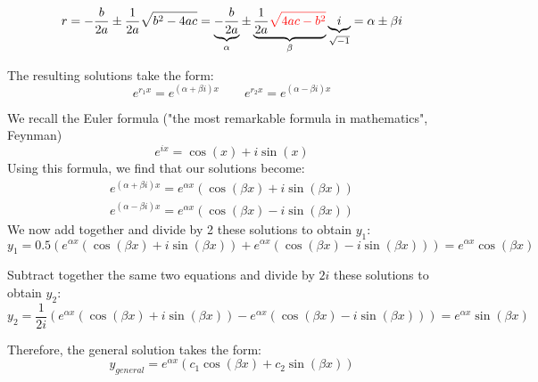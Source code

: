 \begin{equation*}
r=-\frac{b}{2a}\pm \frac{1}{2a}\sqrt{b^2-4ac}=\underbrace{-\frac{b}{2a}}_{\alpha}\pm \underbrace{\frac{1}{2a}\textcolor{red}{\sqrt{4ac-b^2}}}_\beta \underbrace{i}_{\sqrt{-1}}=\alpha\pm\beta i
\end{equation*}

The resulting solutions take the form:
\begin{equation*}
e^{r_1x}=e^{(\alpha+\beta i)x} \qquad e^{r_2x}=e^{(\alpha-\beta i)x}
\end{equation*}

We recall the Euler formula ("the most remarkable formula in mathematics", Feynman)
\begin{equation}
e^{ix}=\cos(x)+i \sin(x)
\end{equation}
Using this formula, we find that our solutions become:
\begin{align*}
e^{(\alpha+\beta i)x}=e^{\alpha x}\left(\cos(\beta x)+i\sin(\beta x)\right)\\
e^{(\alpha-\beta i)x}=e^{\alpha x}\left(\cos(\beta x)-i\sin(\beta x)\right)
\end{align*}
We now add together and divide by 2 these solutions to obtain $y_1$:
\begin{equation*}
y_1=0.5(e^{\alpha x}\left(\cos(\beta x)+i\sin(\beta x)\right)+e^{\alpha x}\left(\cos(\beta x)-i\sin(\beta x)\right))=e^{\alpha x}\cos(\beta x)
\end{equation*}

Subtract together the same two equations and divide by $2i$ these solutions to obtain $y_2$:
\begin{equation*}
y_2=\frac{1}{2i}(e^{\alpha x}\left(\cos(\beta x)+i\sin(\beta x)\right)-e^{\alpha x}\left(\cos(\beta x)-i\sin(\beta x)\right))=e^{\alpha x}\sin(\beta x)
\end{equation*}

Therefore, the general solution takes the form:
\begin{equation}
\boxed{y_{general}=e^{\alpha x}\left(c_1\cos(\beta x)+c_2\sin(\beta x)\right)}
\end{equation}




